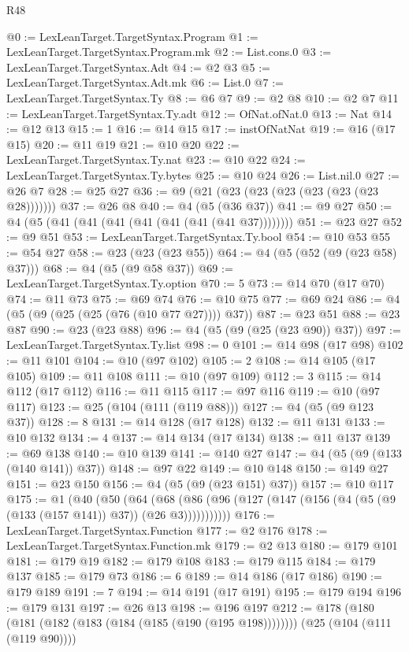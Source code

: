 \begin{lexlean}{R48}
\begin{coremodule}
@0 := LexLeanTarget.TargetSyntax.Program
@1 := LexLeanTarget.TargetSyntax.Program.mk
@2 := List.cons.{0}
@3 := LexLeanTarget.TargetSyntax.Adt
@4 := @2 @3
@5 := LexLeanTarget.TargetSyntax.Adt.mk
@6 := List.{0}
@7 := LexLeanTarget.TargetSyntax.Ty
@8 := @6 @7
@9 := @2 @8
@10 := @2 @7
@11 := LexLeanTarget.TargetSyntax.Ty.adt
@12 := OfNat.ofNat.{0}
@13 := Nat
@14 := @12 @13
@15 := 1
@16 := @14 @15
@17 := instOfNatNat
@19 := @16 (@17 @15)
@20 := @11 @19
@21 := @10 @20
@22 := LexLeanTarget.TargetSyntax.Ty.nat
@23 := @10 @22
@24 := LexLeanTarget.TargetSyntax.Ty.bytes
@25 := @10 @24
@26 := List.nil.{0}
@27 := @26 @7
@28 := @25 @27
@36 := @9 (@21 (@23 (@23 (@23 (@23 (@23 (@23 @28)))))))
@37 := @26 @8
@40 := @4 (@5 (@36 @37))
@41 := @9 @27
@50 := @4 (@5 (@41 (@41 (@41 (@41 (@41 (@41 (@41 @37))))))))
@51 := @23 @27
@52 := @9 @51
@53 := LexLeanTarget.TargetSyntax.Ty.bool
@54 := @10 @53
@55 := @54 @27
@58 := @23 (@23 (@23 @55))
@64 := @4 (@5 (@52 (@9 (@23 @58) @37)))
@68 := @4 (@5 (@9 @58 @37))
@69 := LexLeanTarget.TargetSyntax.Ty.option
@70 := 5
@73 := @14 @70 (@17 @70)
@74 := @11 @73
@75 := @69 @74
@76 := @10 @75
@77 := @69 @24
@86 := @4 (@5 (@9 (@25 (@25 (@76 (@10 @77 @27)))) @37))
@87 := @23 @51
@88 := @23 @87
@90 := @23 (@23 @88)
@96 := @4 (@5 (@9 (@25 (@23 @90)) @37))
@97 := LexLeanTarget.TargetSyntax.Ty.list
@98 := 0
@101 := @14 @98 (@17 @98)
@102 := @11 @101
@104 := @10 (@97 @102)
@105 := 2
@108 := @14 @105 (@17 @105)
@109 := @11 @108
@111 := @10 (@97 @109)
@112 := 3
@115 := @14 @112 (@17 @112)
@116 := @11 @115
@117 := @97 @116
@119 := @10 (@97 @117)
@123 := @25 (@104 (@111 (@119 @88)))
@127 := @4 (@5 (@9 @123 @37))
@128 := 8
@131 := @14 @128 (@17 @128)
@132 := @11 @131
@133 := @10 @132
@134 := 4
@137 := @14 @134 (@17 @134)
@138 := @11 @137
@139 := @69 @138
@140 := @10 @139
@141 := @140 @27
@147 := @4 (@5 (@9 (@133 (@140 @141)) @37))
@148 := @97 @22
@149 := @10 @148
@150 := @149 @27
@151 := @23 @150
@156 := @4 (@5 (@9 (@23 @151) @37))
@157 := @10 @117
@175 := @1
    (@40
      (@50
        (@64
          (@68 (@86 (@96 (@127 (@147 (@156 (@4 (@5 (@9 (@133 (@157 @141)) @37)) (@26 @3)))))))))))
@176 := LexLeanTarget.TargetSyntax.Function
@177 := @2 @176
@178 := LexLeanTarget.TargetSyntax.Function.mk
@179 := @2 @13
@180 := @179 @101
@181 := @179 @19
@182 := @179 @108
@183 := @179 @115
@184 := @179 @137
@185 := @179 @73
@186 := 6
@189 := @14 @186 (@17 @186)
@190 := @179 @189
@191 := 7
@194 := @14 @191 (@17 @191)
@195 := @179 @194
@196 := @179 @131
@197 := @26 @13
@198 := @196 @197
@212 := @178
    (@180 (@181 (@182 (@183 (@184 (@185 (@190 (@195 @198))))))))
    (@25 (@104 (@111 (@119 @90))))

\end{coremodule}
\end{lexlean}
